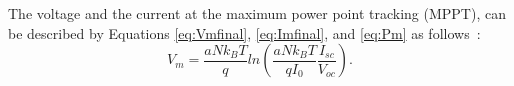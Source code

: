 \documentclass[journal]{IEEEtran}
\begin{document}
%
%
%
%
%
%
%
%
The voltage and the current at the maximum power point tracking (MPPT), can be described by Equations \eqref{eq:Vmfinal}, \eqref{eq:Imfinal}, and \eqref{eq:Pm}  as follows~\cite{Saloux}: %
\begin{equation}
\label{eq:Vmfinal}
V_{m}=\dfrac{aNk_{B}T}{q} ln \left( \dfrac{aNk_{B}T}{qI_{0}} \dfrac{I_{sc}}{V_{oc}}  \right). 
\end{equation}
\end{document}
